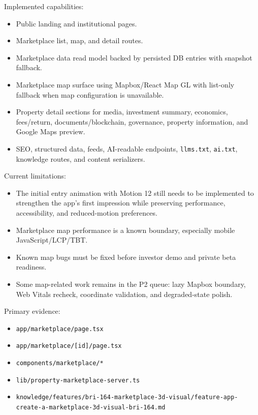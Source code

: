 \documentclass[
  10pt,
  letterpaper,
]{article}
\providecommand{\tightlist}{%
  \setlength{\itemsep}{0pt}\setlength{\parskip}{0pt}}
\let\oldtexttt\texttt
\renewcommand{\texttt}[1]{\oldtexttt{\small #1}}
\begin{document}
Implemented capabilities:

\begin{itemize}
\tightlist
\item
  Public landing and institutional pages.
\item
  Marketplace list, map, and detail routes.
\item
  Marketplace data read model backed by persisted DB entries with
  snapshot fallback.
\item
  Marketplace map surface using Mapbox/React Map GL with list-only
  fallback when map configuration is unavailable.
\item
  Property detail sections for media, investment summary, economics,
  fees/return, documents/blockchain, governance, property information,
  and Google Maps preview.
\item
  SEO, structured data, feeds, AI-readable endpoints, \texttt{llms.txt},
  \texttt{ai.txt}, knowledge routes, and content serializers.
\end{itemize}

Current limitations:

\begin{itemize}
\tightlist
\item
  The initial entry animation with Motion 12 still needs to be
  implemented to strengthen the app's first impression while preserving
  performance, accessibility, and reduced-motion preferences.
\item
  Marketplace map performance is a known boundary, especially mobile
  JavaScript/LCP/TBT.
\item
  Known map bugs must be fixed before investor demo and private beta
  readiness.
\item
  Some map-related work remains in the P2 queue: lazy Mapbox boundary,
  Web Vitals recheck, coordinate validation, and degraded-state polish.
\end{itemize}

Primary evidence:

\begin{itemize}
\tightlist
\item
  \texttt{app/marketplace/page.tsx}
\item
  \texttt{app/marketplace/{[}id{]}/page.tsx}
\item
  \texttt{components/marketplace/*}
\item
  \texttt{lib/property-marketplace-server.ts}
\item
  \texttt{knowledge/features/bri-164-marketplace-3d-visual/feature-app-create-a-marketplace-3d-visual-bri-164.md}
\end{itemize}
\end{document}
